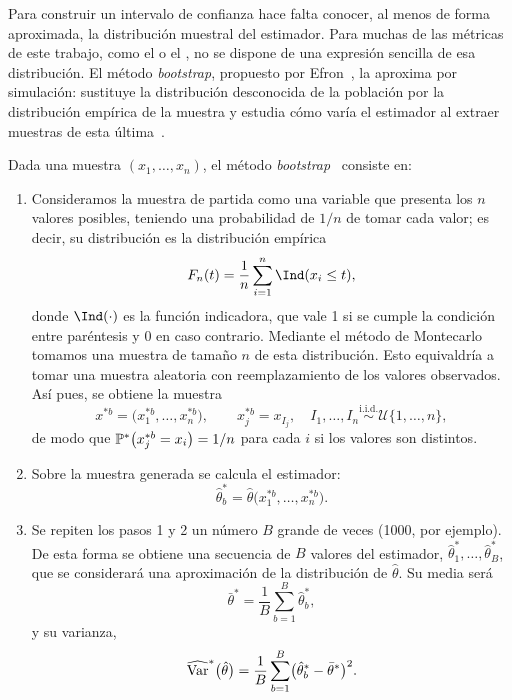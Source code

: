 
Para construir un intervalo de confianza hace falta conocer, al menos de forma aproximada, la distribución muestral del estimador. Para muchas de las métricas de este trabajo, como el \AUROC o el , no se dispone de una expresión sencilla de esa distribución. El método \emph{bootstrap}, propuesto por Efron~\cite{efron1979}, la aproxima por simulación: sustituye la distribución desconocida de la población por la distribución empírica de la muestra y estudia cómo varía el estimador al extraer muestras de esta última~\cite{pena2008fundamentos}.

Dada una muestra $(x_1, \dots, x_n)$, el método \emph{bootstrap}~\cite{pena2008fundamentos} consiste en:

\begin{enumerate}
  \item Consideramos la muestra de partida como una variable que presenta los $n$ valores posibles,
  teniendo una probabilidad de $1/n$ de tomar cada valor; es decir, su distribución es la
  distribución empírica
  \[
    F_n(t) = \frac{1}{n} \sum_{i=1}^{n} \Ind(x_i \le t),
  \]
  donde $\Ind(\cdot)$ es la función indicadora, que vale 1 si se cumple la condición entre paréntesis y 0 en caso contrario.
  Mediante el método de Montecarlo tomamos una muestra de tamaño $n$ de esta distribución. Esto
  equivaldría a tomar una muestra aleatoria con reemplazamiento de los valores observados. Así pues,
  se obtiene la muestra
  \[
    x^{*b} = \bigl(x^{*b}_1, \dots, x^{*b}_n\bigr), \qquad
    x^{*b}_j = x_{I_j}, \quad I_1, \dots, I_n \overset{\text{i.i.d.}}{\sim} \mathcal{U}\{1, \dots, n\},
  \]
  de modo que $\mathbb{P}^*\bigl(x^{*b}_j = x_i\bigr) = 1/n$ para cada $i$ si los valores son distintos.

  \item Sobre la muestra generada se calcula el estimador:
  \[
    \hat\theta^*_b = \hat\theta\bigl(x^{*b}_1, \dots, x^{*b}_n\bigr).
  \]

  \item Se repiten los pasos 1 y 2 un número $B$ grande de veces (1000, por ejemplo). De esta forma se
  obtiene una secuencia de $B$ valores del estimador, $\hat\theta^*_1, \dots, \hat\theta^*_B$, que se considerará
  una aproximación de la distribución de $\hat\theta$. Su media será
  \[
    \bar\theta^* = \frac{1}{B} \sum_{b=1}^{B} \hat\theta^*_b,
  \]
  y su varianza,
  \[
    \widehat{\operatorname{Var}}^*\bigl(\hat\theta\bigr) = \frac{1}{B} \sum_{b=1}^{B} \bigl(\hat\theta^*_b - \bar\theta^*\bigr)^2 .
  \]
  ~\cite{pena2008fundamentos}
\end{enumerate} 

